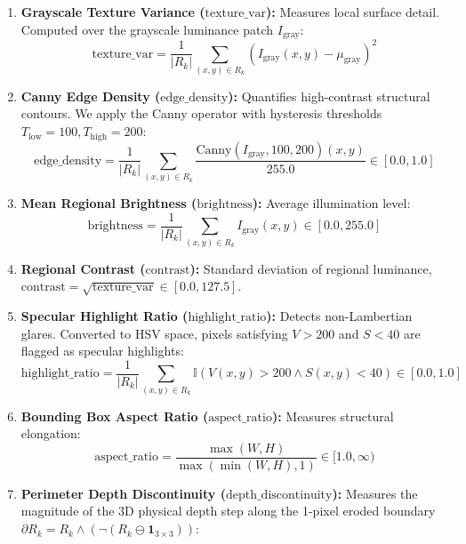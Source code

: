 \documentclass[11pt,a4paper]{article}
\begin{document}
\begin{enumerate}
    \item \textbf{Grayscale Texture Variance ($\text{texture\_var}$):} Measures local surface detail. Computed over the grayscale luminance patch $I_{\mathrm{gray}}$:
    \begin{equation}
    \label{eq:feat_texture}
    \text{texture\_var} = \frac{1}{|R_k|} \sum_{(x,y) \in R_k} \left( I_{\mathrm{gray}}(x,y) - \mu_{\mathrm{gray}} \right)^2
    \end{equation}
    \item \textbf{Canny Edge Density ($\text{edge\_density}$):} Quantifies high-contrast structural contours. We apply the Canny operator with hysteresis thresholds $T_{\mathrm{low}}=100, T_{\mathrm{high}}=200$:
    \begin{equation}
    \label{eq:feat_edge}
    \text{edge\_density} = \frac{1}{|R_k|} \sum_{(x,y) \in R_k} \frac{\text{Canny}(I_{\mathrm{gray}}, 100, 200)(x,y)}{255.0} \in [0.0, 1.0]
    \end{equation}
    \item \textbf{Mean Regional Brightness ($\text{brightness}$):} Average illumination level:
    \begin{equation}
    \label{eq:feat_brightness}
    \text{brightness} = \frac{1}{|R_k|} \sum_{(x,y) \in R_k} I_{\mathrm{gray}}(x,y) \in [0.0, 255.0]
    \end{equation}
    \item \textbf{Regional Contrast ($\text{contrast}$):} Standard deviation of regional luminance, $\text{contrast} = \sqrt{\text{texture\_var}} \in [0.0, 127.5]$.
    \item \textbf{Specular Highlight Ratio ($\text{highlight\_ratio}$):} Detects non-Lambertian glares. Converted to HSV space, pixels satisfying $V > 200$ and $S < 40$ are flagged as specular highlights:
    \begin{equation}
    \label{eq:feat_specular}
    \text{highlight\_ratio} = \frac{1}{|R_k|} \sum_{(x,y) \in R_k} \mathbb{I}\left( V(x,y) > 200 \land S(x,y) < 40 \right) \in [0.0, 1.0]
    \end{equation}
    \item \textbf{Bounding Box Aspect Ratio ($\text{aspect\_ratio}$):} Measures structural elongation:
    \begin{equation}
    \label{eq:feat_aspect}
    \text{aspect\_ratio} = \frac{\max(W, H)}{\max(\min(W, H), 1)} \in [1.0, \infty)
    \end{equation}
    \item \textbf{Perimeter Depth Discontinuity ($\text{depth\_discontinuity}$):} Measures the magnitude of the 3D physical depth step along the 1-pixel eroded boundary $\partial R_k = R_k \land (\neg (R_k \ominus \mathbf{1}_{3\times 3}))$:

\end{enumerate}
\end{document}

